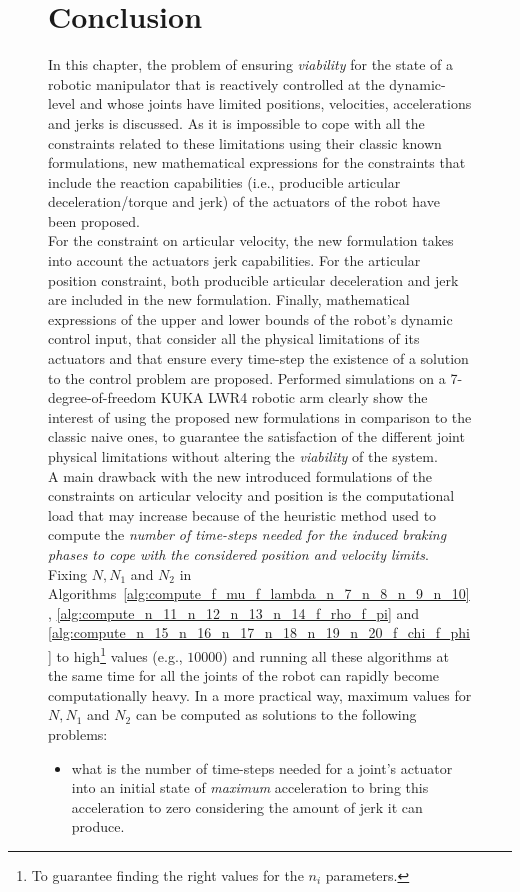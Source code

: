 \begin{figure}[!htbp]
\section{Conclusion}
\label{sec:concl_comp_cnstr}
In this chapter, the problem of ensuring \textit{viability} for the state of a robotic manipulator that is reactively controlled at the dynamic-level and whose joints have limited positions, velocities, accelerations and jerks is discussed. As it is impossible to cope with all the constraints related to these limitations using their classic known formulations, new mathematical expressions for the constraints that include the reaction capabilities (i.e., producible articular deceleration/torque and jerk) of the actuators of the robot have been proposed. \\
For the constraint on articular velocity, the new formulation takes into account the actuators jerk capabilities. For the articular position constraint, both producible articular deceleration and jerk are included in the new formulation. Finally, mathematical expressions of the upper and lower bounds of the robot's dynamic control input, that consider all the physical limitations of its actuators and that ensure every time-step the existence of a solution to the control problem are proposed. Performed simulations on a 7-degree-of-freedom KUKA LWR4 robotic arm clearly show the interest of using the proposed new formulations in comparison to the classic naive ones, to guarantee the satisfaction of the different joint physical limitations without altering the \textit{viability} of the system. 
\\
A main drawback with the new introduced formulations of the constraints on articular velocity and position is the computational load that may increase because of the heuristic method used to compute the \textit{number of time-steps needed for the induced braking phases to cope with the considered position and velocity limits}. Fixing $N, N_1$ and $N_2$ in Algorithms~\ref{alg:compute_f_mu_f_lambda_n_7_n_8_n_9_n_10}, \ref{alg:compute_n_11_n_12_n_13_n_14_f_rho_f_pi} and \ref{alg:compute_n_15_n_16_n_17_n_18_n_19_n_20_f_chi_f_phi} to high\footnote{To guarantee finding the right values for the $n_i$ parameters.} values (e.g., $10000$) and running all these algorithms at the same time for all the joints of the robot can rapidly become computationally heavy. In a more practical way, maximum values for $N, N_1$ and $N_2$ can be computed as solutions to the following problems:
\begin{itemize}
\item what is the number of time-steps needed for a joint's actuator into an initial state of \textit{maximum} acceleration to bring this acceleration to zero considering the amount of jerk it can produce.

\end{itemize}
\end{figure}
